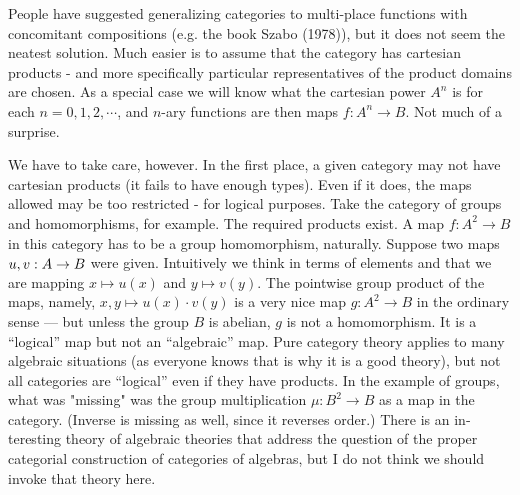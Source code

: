 People have suggested generalizing categories to multi-place functions with concomitant compositions (e.g. the book Szabo (1978)), but it does not seem the neatest solution. Much easier is to assume that the category has cartesian products - and more specifically particular representatives of the product
domains are chosen. As a special case we will know what the cartesian power $A^n$ is for each $n=0,1,2,\cdots$, and $n$-ary functions
are then maps $f: A^n\to B$. Not much of a surprise.

We have to take care, however. In the first place, a given category may not have cartesian products (it fails to have enough types). Even if it does, the maps allowed may be too restricted - for logical purposes. Take the category of groups and homomorphisms, for example. The required products exist.
A map $f : A^2 \to B$ in this category has to be a group homomor­phism, naturally. Suppose two maps $u,v: A \rightarrow B$ were given.
Intuitively we think in terms of elements and that we are map­ping $x \mapsto u(x)$ and $y \mapsto v(y)$. The pointwise group product of the maps, namely, $x,y \mapsto  u(x) \cdot v(y)$ is a very nice map $g : A^2 \to B$ in the ordinary sense --- but unless the group $B$ is abelian, $g$ is not a homomorphism. It is a ``logical'' map but not an ``algebra­ic'' map. Pure category theory applies to many algebraic situa­tions (as everyone knows that is why it is a good theory), but not all categories are ``logical'' even if they have products. In the example of groups, what was "missing" was the group
multiplication $\mu: B^2 \to B$ as a map in the category. (Inverse is missing as well, since it reverses order.) There is an in­teresting theory of algebraic theories that address the ques­tion of the proper categorial construction of categories of al­gebras, but I do not think we should invoke that theory here.

